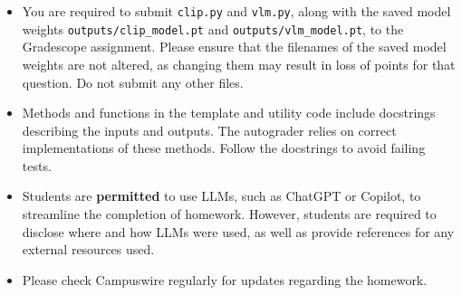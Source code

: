 \begin{itemize}
  \item 
    You are required to submit \texttt{clip.py} and \texttt{vlm.py}, along with the saved model weights \texttt{outputs/clip\_model.pt} and \texttt{outputs/vlm\_model.pt}, to the Gradescope \texttt{\hwc{}} assignment. Please ensure that the filenames of the saved model weights are not altered, as changing them may result in loss of points for that question.
    Do not submit any other files.

    \item
    Methods and functions in the template and utility code include
    docstrings describing the inputs and outputs.  The autograder
    relies on correct implementations of these methods.  Follow the
    docstrings to avoid failing tests.

    \item 
    Students are \textbf{permitted} to use LLMs, such as ChatGPT or Copilot, to streamline
    the completion of homework. However, students are required to disclose where and how LLMs
    were used, as well as provide references for any external resources used. 

    \item Please check Campuswire regularly for updates regarding the homework.
\end{itemize}
